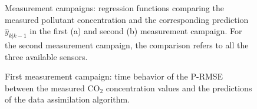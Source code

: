 \documentclass[journal]{IEEEtran}
\begin{document}
\begin{figure}[p]
\hspace*{-1cm} 
	\centering
	\hfil
\hspace*{-1cm} 
	\caption{Measurement campaigns:  regression functions comparing the measured pollutant concentration and the corresponding prediction $\hat{y}_{k|k-1}$ in the first (a) and second (b) measurement campaign. For the second measurement campaign, the comparison refers to all the three available sensors.}
	\label{fig:regression_real_truth}
\end{figure}
\begin{figure}[p]
\hspace*{-1cm} 
	\centering
\hfil
	\caption{First measurement campaign: time behavior of the P-RMSE between the measured CO$_2$ concentration values and the predictions of the data assimilation algorithm.}
	\label{fig:rmse_real_mes1}
\end{figure}
\end{document}
